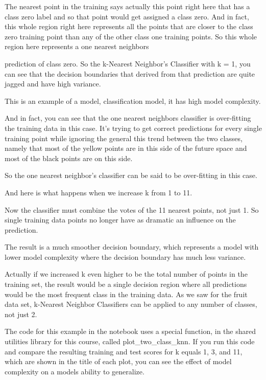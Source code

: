 \begin{multicols}{2}
The nearest point in the training says actually this point right here that has a class zero label and so that point would get assigned a class zero. And in fact, this whole region right here represents all the points that are closer to the class zero training point than any of the other class one training points. So this whole region here represents a one nearest neighbors 

prediction of class zero. So the k-Nearest Neighbor's Classifier with k = 1, you can see that the decision boundaries that derived from that prediction are quite jagged and have high variance. 

This is an example of a model, classification model, it has high model complexity. 

And in fact, you can see that the one nearest neighbors classifier is over-fitting the training data in this case. It's trying to get correct predictions for every single training point while ignoring the general this trend between the two classes, namely that most of the yellow points are in this side of the future space and most of the black points are on this side. 

So the one nearest neighbor's classifier can be said to be over-fitting in this case. 

And here is what happens when we increase k from 1 to 11. 

Now the classifier must combine the votes of the 11 nearest points, not just 1. So single training data points no longer have as dramatic an influence on the prediction. 

The result is a much smoother decision boundary, which represents a model with lower model complexity where the decision boundary has much less variance. 

Actually if we increased k even higher to be the total number of points in the training set, the result would be a single decision region where all predictions would be the most frequent class in the training data. As we saw for the fruit data set, k-Nearest Neighbor Classifiers can be applied to any number of classes, not just 2. 

The code for this example in the notebook uses a special function, in the shared utilities library for this course, called plot_two_class_knn. If you run this code and compare the resulting training and test scores for k equals 1, 3, and 11, which are shown in the title of each plot, you can see the effect of model complexity on a models ability to generalize. 


\end{multicols}
